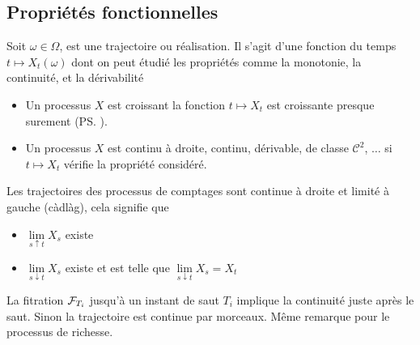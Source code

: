 \subsection{Propriétés fonctionnelles}
Soit $\omega\in\Omega$,  est une trajectoire ou réalisation. Il s'agit d'une fonction du temps $t\mapsto X_t(\omega)$ dont on peut étudié les propriétés comme la monotonie, la continuité, et la dérivabilité 
\begin{itemize}
  \item Un processus $X$ est croissant la fonction $t\mapsto X_t$ est croissante presque surement (\ps).
  \item Un processus $X$ est continu à droite, continu, dérivable, de classe $\mathcal{C}^2$, $\ldots$ si  $t\mapsto X_t$ vérifie la propriété considéré.
\end{itemize}
\begin{ex}
Les trajectoires des processus de comptages sont continue à droite et limité à gauche (càdlàg), cela signifie que 
\begin{itemize}
    \item $\underset{s\uparrow t}{\lim}X_s$ existe
    \item $\underset{s\downarrow t}{\lim}X_s$ existe et est telle que $\underset{s\downarrow t}{\lim}X_s = X_t$ 
\end{itemize}
La fitration $\mathcal{F}_{T_{i}}$ jusqu'à un instant de saut $T_i$ implique la continuité juste après le saut. Sinon la trajectoire est continue par morceaux. Même remarque pour le processus de richesse.
\end{ex}
